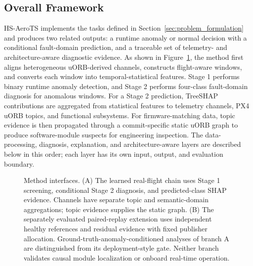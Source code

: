 \subsection{Overall Framework}
\label{sec:overall_framework}

HS-AeroTS implements the tasks defined in Section~\ref{sec:problem_formulation} and produces two related outputs: a runtime anomaly or normal decision with a conditional fault-domain prediction, and a traceable set of telemetry- and architecture-aware diagnostic evidence. As shown in Figure~\ref{fig:methodological_pipeline}, the method first aligns heterogeneous uORB-derived channels, constructs flight-aware windows, and converts each window into temporal-statistical features. Stage 1 performs binary runtime anomaly detection, and Stage 2 performs four-class fault-domain diagnosis for anomalous windows. For a Stage 2 prediction, TreeSHAP contributions are aggregated from statistical features to telemetry channels, PX4 uORB topics, and functional subsystems. For firmware-matching data, topic evidence is then propagated through a commit-specific static uORB graph to produce software-module suspects for engineering inspection. The data-processing, diagnosis, explanation, and architecture-aware layers are described below in this order; each layer has its own input, output, and evaluation boundary.

\begin{figure}[!t]
    \centering
    \resizebox{\textwidth}{!}{}
    \caption{Method interfaces. (A) The learned real-flight chain uses Stage 1 screening, conditional Stage 2 diagnosis, and predicted-class SHAP evidence. Channels have separate topic and semantic-domain aggregations; topic evidence supplies the static graph. (B) The separately evaluated paired-replay extension uses independent healthy references and residual evidence with fixed publisher allocation. Ground-truth-anomaly-conditioned analyses of branch A are distinguished from its deployment-style gate. Neither branch validates causal module localization or onboard real-time operation.}
    \label{fig:methodological_pipeline}
\end{figure}
